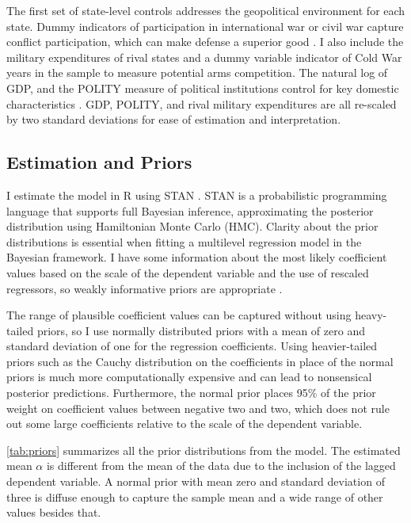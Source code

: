 \documentclass[12pt]{article}
\begin{document}
The first set of state-level controls addresses the geopolitical environment for each state. Dummy indicators of participation in international war or civil war capture conflict participation, which can make defense a superior good \citep{OlsonZeckhauser1966}. I also include the military expenditures of rival states and a dummy variable indicator of Cold War years in the sample to measure potential arms competition. The natural log of GDP, and the POLITY measure of political institutions control for key domestic characteristics \citep{FordhamWalker2005}. GDP, POLITY, and rival military expenditures are all re-scaled by two standard deviations for ease of estimation and interpretation. 


\subsection*{Estimation and Priors} 

I estimate the model in \textsf{R} using STAN \citep{Carpenteretal2016}. STAN is a probabilistic programming language that supports full Bayesian inference, approximating the posterior distribution using Hamiltonian Monte Carlo (HMC). Clarity about the prior distributions is essential when fitting a multilevel regression model in the Bayesian framework. I have some information about the most likely coefficient values based on the scale of the dependent variable and the use of rescaled regressors, so weakly informative priors are appropriate \citep{Gelmanetal2014}. 

The range of plausible coefficient values can be captured without using heavy-tailed priors, so I use normally distributed priors with a mean of zero and standard deviation of one for the regression coefficients. Using heavier-tailed priors such as the Cauchy distribution on the coefficients in place of the normal priors is much more computationally expensive and can lead to nonsensical posterior predictions. Furthermore, the normal prior places 95\% of the prior weight on coefficient values between negative two and two, which does not rule out some large coefficients relative to the scale of the dependent variable. 

\autoref{tab:priors} summarizes all the prior distributions from the model. The estimated mean $\alpha$ is different from the mean of the data due to the inclusion of the lagged dependent variable. A normal prior with mean zero and standard deviation of three is diffuse enough to capture the sample mean and a wide range of other values besides that. 
\end{document}

